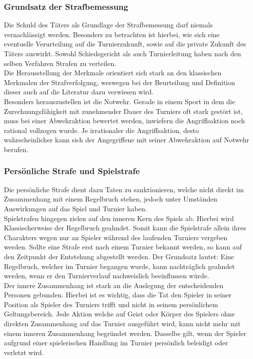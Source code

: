 \documentclass[a4paper, 12pt]{article}
\begin{document}
\subsubsection{Grundsatz der Strafbemessung}
Die Schuld des Täters als Grundlage der Strafbemessung darf niemals vernachlässigt werden. Besonders zu betrachten ist hierbei, wie sich eine eventuelle Verurteilung auf die Turnierzukunft, sowie auf die private Zukunft des Täters auswirkt. Sowohl Schiedsgericht als auch Turnierleitung haben nach den selben Verfahren Strafen zu verteilen. \\
Die Herausstellung der Merkmale orientiert sich stark an den klassischen Merkmalen der Strafverfolgung, weswegen bei der Beurteilung und Definition dieser auch auf die Literatur dazu verwiesen wird.\\
Besonders herauszustellen ist die Notwehr. Gerade in einem Sport in dem die Zurechnungsfähigkeit mit zunehmender Dauer des Turniers oft stark gestört ist, muss bei einer Abwehraktion bewertet werden, inwiefern die Angriffsaktion noch rational vollzogen wurde. Je irrationaler die Angriffsaktion, desto wahrscheinlicher kann sich der Angegriffene mit seiner Abwehraktion auf Notwehr berufen.\\
\subsubsection{Persönliche Strafe und Spielstrafe}
Die persönliche Strafe dient dazu Taten zu sanktionieren, welche nicht direkt im Zusammenhang mit einem Regelbruch stehen, jedoch unter Umständen Auswirkungen auf das Spiel und Turnier haben.\\
Spielstrafen hingegen zielen auf den inneren Kern des Spiels ab. Hierbei wird Klassischerweise der Regelbruch geahndet. Somit kann die Spielstrafe allein ihres Charakters wegen nur an Spieler während des laufenden Turniers vergeben werden. Sollte eine Strafe erst nach einem Turnier bekannt werden, so kann auf den Zeitpunkt der Entstehung abgestellt werden. Der Grundsatz lautet: Eine Regelbruch, welcher im Turnier begangen wurde, kann nachträglich geahndet werden, wenn er den Turnierverlauf nachweislich beeinflussen würde.\\
Der innere Zusammenhang ist stark an die Auslegung der entscheidenden Personen gebunden. Hierbei ist es wichtig, dass die Tat den Spieler in seiner Position als Spieler des Turniers trifft und nicht in seinem persönlichem Geltungsbereich. Jede Aktion welche auf Geist oder Körper des Spielers ohne direkten Zusammenhang auf das Turnier ausgeführt wird, kann nicht mehr mit einem inneren Zusammenhang begründet werden. Dasselbe gilt, wenn der Spieler aufgrund einer spielerischen Handlung im Turnier persönlich beleidigt oder verletzt wird. 
\end{document}
